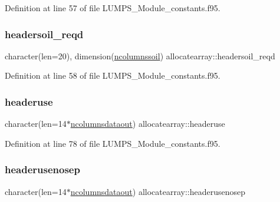 Definition at line 57 of file L\+U\+M\+P\+S\+\_\+\+Module\+\_\+constants.\+f95.

\mbox{\label{namespaceallocatearray_ae457c859ad17442ce09399707fecd342}} 
\subsubsection{\texorpdfstring{headersoil\+\_\+reqd}{headersoil\_reqd}}
{\footnotesize\ttfamily character(len=20), dimension(\hyperlink{namespaceallocatearray_a0e0e9877b1623ca21932a4793c7b8641}{ncolumnssoil}) allocatearray\+::headersoil\+\_\+reqd}



Definition at line 58 of file L\+U\+M\+P\+S\+\_\+\+Module\+\_\+constants.\+f95.

\mbox{\label{namespaceallocatearray_a62706bdf1d2b60377a7e57313210e520}} 
\subsubsection{\texorpdfstring{headeruse}{headeruse}}
{\footnotesize\ttfamily character(len=14$\ast$\hyperlink{namespaceallocatearray_a9408900bed6c87ed095d2c688c1506a0}{ncolumnsdataout}) allocatearray\+::headeruse}



Definition at line 78 of file L\+U\+M\+P\+S\+\_\+\+Module\+\_\+constants.\+f95.

\mbox{\label{namespaceallocatearray_a3c51b4919b1d1ad3e56560fc4409aa43}} 
\subsubsection{\texorpdfstring{headerusenosep}{headerusenosep}}
{\footnotesize\ttfamily character(len=14$\ast$\hyperlink{namespaceallocatearray_a9408900bed6c87ed095d2c688c1506a0}{ncolumnsdataout}) allocatearray\+::headerusenosep}



